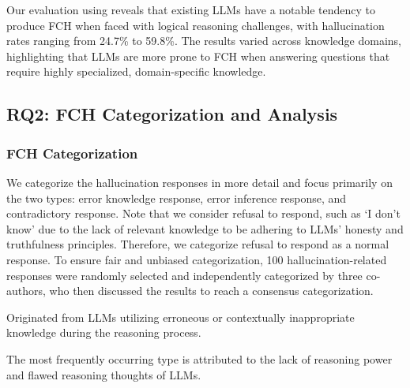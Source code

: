 \begin{tcolorbox}[title=ANSWER to RQ1, boxrule=0.8pt,boxsep=1.5pt,left=2pt,right=2pt,top=2pt,bottom=1pt]

Our evaluation using \tool reveals that existing LLMs have a notable tendency to produce FCH when faced with logical reasoning challenges, with hallucination rates ranging from 24.7\% to 59.8\%. The results varied across knowledge domains, highlighting that LLMs are more prone to FCH when answering questions that require highly specialized, domain-specific knowledge. 

\end{tcolorbox} 

\subsection{RQ2: FCH Categorization and Analysis}
\subsubsection{FCH Categorization}
We categorize the hallucination responses in more detail and focus primarily on the two types: error knowledge response, error inference response, and contradictory response. Note that we consider refusal to respond, such as `I don't know' due to the lack of relevant knowledge to be adhering to LLMs' honesty and truthfulness principles. Therefore, we categorize refusal to respond as a normal response. 
To ensure fair and unbiased categorization, 100 hallucination-related responses were randomly selected and independently categorized by three co-authors, who then discussed the results to reach a consensus categorization.

 Originated from LLMs utilizing erroneous or contextually inappropriate knowledge during the reasoning process.

 The most frequently occurring type is attributed to the lack of reasoning power and flawed reasoning thoughts of LLMs.

